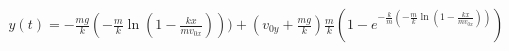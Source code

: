 \documentclass[preview]{standalone}
\begin{document}
\begin{align*}
y(t)=-\frac{mg}{k}(-\frac{m}{k}\ln(1-\frac{kx}{mv_{0x}})))+(v_{0y}+\frac{mg}{k})\frac{m}{k}(1-e^{-\frac{k}{m}(-\frac{m}{k}\ln(1-\frac{kx}{mv_{0x}}))})
\end{align*}
\end{document}
